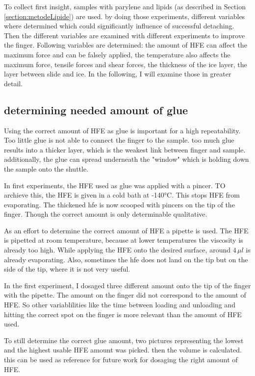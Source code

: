 To collect first insight, samples with parylene and lipids (as described in Section \ref{section:metodeLipide}) are used. by doing those experiments, different variables where determined which could significantly influence of successful detaching. Then the different variables are examined with different experiments to improve the finger. Following variables are determined: the amount of HFE can affect the maximum force and can be falsely applied, the temperature also affects the maximum force, tensile forces and shear forces, the thickness of the ice layer, the layer between slide and ice. In the following, I will examine those in greater detail.

\subsection{determining needed amount of glue}

Using the correct amount of HFE as glue is important for a high repeatability. Too little glue is not able to connect the finger to the sample. too much glue results into a thicker layer, which is the weakest link between finger and sample. additionally, the glue can spread underneath the "window" which is holding down the sample onto the shuttle. 

In first experiments, the HFE used as glue was applied with a pincer. TO archieve this, the HFE is given in a cold bath at -140°C. This stops HFE from evaporating. The thickened hfe is now scooped with pincers on the tip of the finger. Though the correct amount is only determinable qualitative.

As an effort to determine the correct amount of HFE a pipette is used. The HFE is pipetted at room temperature, because at lower temperatures the viscosity is already too high. While applying the HFE onto the desired surface, around $4\,\mu l$ is already evaporating. Also, sometimes the hfe does not land on the tip but on the side of the tip, where it is not very useful. 

In the first experiment, I dosaged three different amount onto the tip of the finger with the pipette. The amount on the finger did not correspond to the amount of HFE. So other variablilities like the time between loading and unloading and hitting the correct spot on the finger is more relevant than the amount of HFE used.

To still determine the correct glue amount, two pictures representing the lowest and the highest usable HFE amount was picked. then the volume is calculated. this can be used as reference for future work for dosaging the right amount of HFE.

